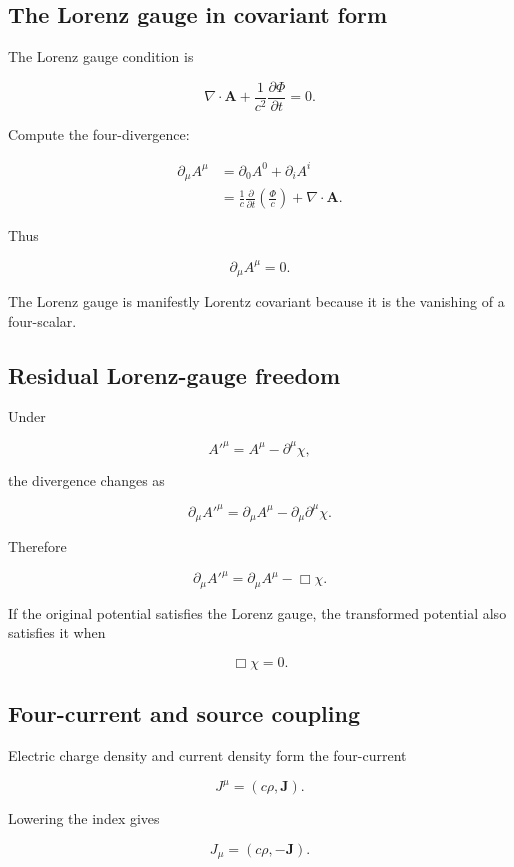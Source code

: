 \subsection{The Lorenz gauge in covariant form}

The Lorenz gauge condition is

\[
\nabla\cdot\mathbf{A}
+
\frac{1}{c^2}
\frac{\partial\Phi}{\partial t}
=0.
\]

Compute the four-divergence:

\[
\begin{aligned}
\partial_{\mu}A^{\mu}
&=
\partial_0A^0
+
\partial_iA^i\\
&=
\frac{1}{c}
\frac{\partial}{\partial t}
\left(
\frac{\Phi}{c}
\right)
+
\nabla\cdot\mathbf{A}.
\end{aligned}
\]

Thus

\[
\boxed{
\partial_{\mu}A^{\mu}=0
}.
\]

The Lorenz gauge is manifestly Lorentz covariant because it is the vanishing of a four-scalar.

\subsection{Residual Lorenz-gauge freedom}

Under

\[
A'^{\mu}
=
A^{\mu}-\partial^{\mu}\chi,
\]

the divergence changes as

\[
\partial_{\mu}A'^{\mu}
=
\partial_{\mu}A^{\mu}
-
\partial_{\mu}\partial^{\mu}\chi.
\]

Therefore

\[
\partial_{\mu}A'^{\mu}
=
\partial_{\mu}A^{\mu}
-
\Box\chi.
\]

If the original potential satisfies the Lorenz gauge, the transformed potential also satisfies it when

\[
\boxed{
\Box\chi=0
}.
\]

\subsection{Four-current and source coupling}

Electric charge density and current density form the four-current

\[
\boxed{
J^{\mu}
=
\left(
c\rho,
\mathbf{J}
\right)
}.
\]

Lowering the index gives

\[
J_{\mu}
=
\left(
c\rho,
-\mathbf{J}
\right).
\]


